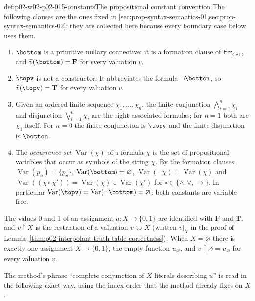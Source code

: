 \begin{hbconvention}{def:p02-w02-p02-015-constants}{The propositional constant convention}
The following clauses are the ones fixed in
\cref{sec:prop-syntax-semantics-01,sec:prop-syntax-semantics-02}; they are
collected here because every boundary case below uses them.
\begin{enumerate}
  \item \(\bottom\) is a primitive nullary connective: it is a formation clause
        of \(\mathsf{Fm}_{\mathsf{CPL}}\), and \(\widehat v(\bottom)=\mathbf{F}\) for every
        valuation \(v\).
  \item \(\topv\) is not a constructor.  It abbreviates the formula
        \(\neg\bottom\), so \(\widehat v(\topv)=\mathbf{T}\) for every valuation
        \(v\).
  \item Given an ordered finite sequence \(\chi_1,\ldots,\chi_n\), the finite
        conjunction \(\bigwedge_{i=1}^{n}\chi_i\) and disjunction
        \(\bigvee_{i=1}^{n}\chi_i\) are the right-associated formulas; for
        \(n=1\) both are \(\chi_1\) itself.  For \(n=0\) the finite
        conjunction is \(\topv\) and the finite disjunction is \(\bottom\).
  \item The \emph{occurrence set} \(\operatorname{Var}(\chi)\) of a formula
        \(\chi\) is the set of propositional variables that occur as symbols of
        the string \(\chi\).  By the formation clauses,
        \(\operatorname{Var}(p_n)=\{p_n\}\),
        \(\operatorname{Var}(\bottom)=\varnothing\),
        \(\operatorname{Var}(\neg\chi)=\operatorname{Var}(\chi)\) and
        \(\operatorname{Var}((\chi\circ\chi'))=
        \operatorname{Var}(\chi)\cup\operatorname{Var}(\chi')\) for
        \(\circ\in\{\land,\lor,\to\}\).  In particular
        \(\operatorname{Var}(\topv)=\operatorname{Var}(\neg\bottom)=
        \varnothing\): both constants are variable-free.
\end{enumerate}
The values \(0\) and \(1\) of an assignment \(u:X\to\{0,1\}\) are identified
with \(\mathbf{F}\) and \(\mathbf{T}\), and \(v\mathbin{\upharpoonright}X\) is the
restriction of a valuation \(v\) to \(X\) (written \(v|_X\) in the proof of
Lemma~\ref{thm:p02-interpolant-truth-table-correctness}).  When
\(X=\varnothing\) there is exactly one assignment \(X\to\{0,1\}\), the empty
function \(u_{\varnothing}\), and \(v\mathbin{\upharpoonright}\varnothing=
u_{\varnothing}\) for every valuation \(v\).
\end{hbconvention}

The method's phrase ``complete conjunction of \(X\)-literals describing
\(u\)'' is read in the following exact way, using the index order that the
method already fixes on \(X\).

